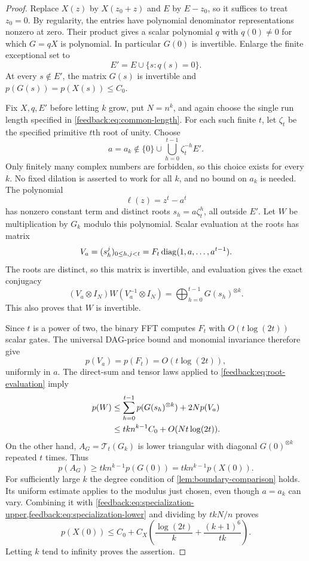 \begin{proof}
Replace $X(z)$ by $X(z_0+z)$ and $E$ by $E-z_0$, so it suffices to
treat $z_0=0$.  By regularity, the entries have polynomial denominator
representations nonzero at zero.  Their product gives a scalar
polynomial $q$ with $q(0)\ne0$ for which $G=qX$ is polynomial.
In particular $G(0)$ is invertible.  Enlarge the finite exceptional
set to
\[
 E'=E\cup\{s:q(s)=0\}.
\]
At every $s\notin E'$, the matrix $G(s)$ is invertible and
$p(G(s))=p(X(s))\leq C_0$.

Fix $X,q,E'$ before letting $k$ grow, put $N=n^k$, and again choose
the single run length specified in \cref{feedback:eq:common-length}.  For each
such finite $t$, let $\zeta_t$ be the specified primitive $t$th root
of unity.  Choose
\begin{equation}
 a=a_k\notin
 \{0\}\cup\bigcup_{h=0}^{t-1}\zeta_t^{-h}E'.
 \label{feedback:eq:forbidden-dilations}
\end{equation}
Only finitely many complex numbers are forbidden, so this choice
exists for every $k$.  No fixed dilation is asserted to work for all
$k$, and no bound on $a_k$ is needed.  The polynomial
\[
 \ell(z)=z^t-a^t
\]
has nonzero constant term and distinct roots
$s_h=a\zeta_t^h$, all outside $E'$.  Let $W$ be multiplication by
$G_k$ modulo this polynomial.  Scalar evaluation at the roots has
matrix
\[
 V_a=(s_h^j)_{0\leq h,j<t}
     =F_t\operatorname{diag}(1,a,\ldots,a^{t-1}).
\]
The roots are distinct, so this matrix is invertible, and evaluation
gives the exact conjugacy
\begin{equation}
 (V_a\otimes I_N)W(V_a^{-1}\otimes I_N)
     =\bigoplus_{h=0}^{t-1}G(s_h)^{\otimes k}.
 \label{feedback:eq:root-evaluation}
\end{equation}
This also proves that $W$ is invertible.

Since $t$ is a power of two, the binary FFT computes $F_t$ with
$O(t\log(2t))$ scalar gates.  The universal DAG-price bound and
monomial invariance therefore give
\[
 p(V_a)=p(F_t)=O(t\log(2t)),
\]
uniformly in $a$.  The direct-sum and tensor laws applied to
\cref{feedback:eq:root-evaluation} imply
\begin{align}
 p(W)
 &\leq\sum_{h=0}^{t-1}p(G(s_h)^{\otimes k})+2Np(V_a)\notag\\
 &\leq tk n^{k-1}C_0+O(Nt\log(2t)).
 \label{feedback:eq:specialization-upper}
\end{align}
On the other hand, $A_G=\mathcal T_t(G_k)$ is lower triangular with
diagonal $G(0)^{\otimes k}$ repeated $t$ times.  Thus
\begin{equation}
 p(A_G)\geq tk n^{k-1}p(G(0))
          =tk n^{k-1}p(X(0)).
 \label{feedback:eq:specialization-lower}
\end{equation}
For sufficiently large $k$ the degree condition of
\cref{lem:boundary-comparison} holds.  Its uniform estimate applies
to the modulus just chosen, even though $a=a_k$ can vary.  Combining
it with \cref{feedback:eq:specialization-upper,feedback:eq:specialization-lower}
and dividing by $tkN/n$ proves
\[
 p(X(0))\leq C_0+
 C_X\left(\frac{\log(2t)}{k}+\frac{(k+1)^6}{tk}\right).
\]
Letting $k$ tend to infinity proves the assertion.
\end{proof}

